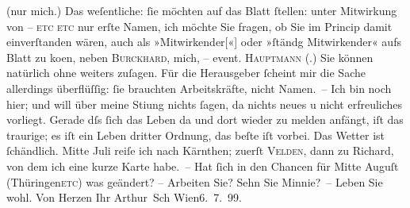 \begin{ledgroupsized}[t]{13cm}
               (nur mich.) Das weſentliche: ſie möchten auf das Blatt ſtellen: unter Mitwirkung von
               – \textsc{etc etc} nur erſte Namen, ich möchte Sie fragen, ob Sie im
               Princip damit {\pb}einverſtanden wären, auch als
                  »Mitwirkender{[}«{]} oder »ſtändg Mitwirkender« aufs Blatt zu ko{\geminationm}en, neben \textsc{Burckhard}, mich, – event. \textsc{Hauptmann} (\label{K_L00934_1v}\label{K_L00934_1h}.) Sie können natürlich ohne weiters zuſagen. Für die Herausgeber ſcheint mir
               die Sache allerdings überflüſſig: ſie brauchten Arbeitskräfte, nicht Namen. –\pend
           \pstart
           Ich bin noch hier; und will über meine {\pb}Sti{\geminationm}ung nichts ſagen, da nichts neues u nicht erfreuliches
               vorliegt. Gerade dſs ſich das Leben da und dort wieder zu melden anfängt, iſt das
               traurige; es iſt ein Leben dritter Ordnung, das beſte iſt vorbei.\pend
           \pstart
           Das Wetter ist ſchändlich. Mitte Juli reiſe ich nach Kärnthen; zuerſt \textsc{Velden}, dann zu Richard, von dem ich eine kurze
               Karte habe. – Hat ſich in den Chancen für Mitte Auguſt (Thü{\pb}ringen\textsc{etc}) was geändert? – Arbeiten Sie? Sehn Sie Minnie? –\pend
           \pstart Leben Sie wohl. Von Herzen Ihr \spacefill\mbox{Arthur Sch}\pend{}\pstart
           Wien6. 7. 99.\pend
           
         
         \endnumbering{}\end{ledgroupsized}  \newcommand{\dateiname}{L00934}\newcommand{\titel}{Arthur Schnitzler an Hugo von Hofmannsthal, 6. 7. 1899}\newcommand{\editorInnen}{ Martin Anton Müller und Gerd-Hermann Susen}
      